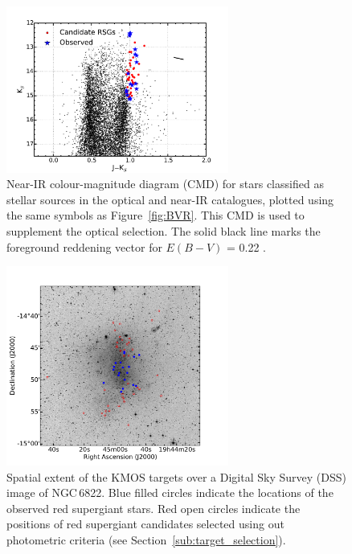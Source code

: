 \begin{figure}
 \centering
 \includegraphics[width=0.65\textwidth]{ngc6822/N6822_jk}
 \caption{
          Near-IR colour-magnitude diagram (CMD) for stars classified as stellar sources in the optical and near-IR catalogues, plotted using the same symbols as Figure~\ref{fig:BVR}.
          This CMD is used to supplement the optical selection.
          The solid black line marks the foreground reddening vector for $E(B-V)$ = 0.22
          \protect\citep{1998ApJ...500..525S}.
         }
 \label{fig:JK}
\end{figure}


\begin{figure}
 \centering
 \includegraphics[width=0.65\textwidth]{ngc6822/N6822_RSGs_paper}
 \caption{Spatial extent of the KMOS targets over a Digital Sky Survey (DSS) image of NGC\,6822.
          Blue filled circles indicate the locations of the observed red supergiant stars.
          Red open circles indicate the positions of red supergiant candidates selected using out photometric criteria (see Section~\ref{sub:target_selection}).
          }
 \label{fig:N6822}
\end{figure}


